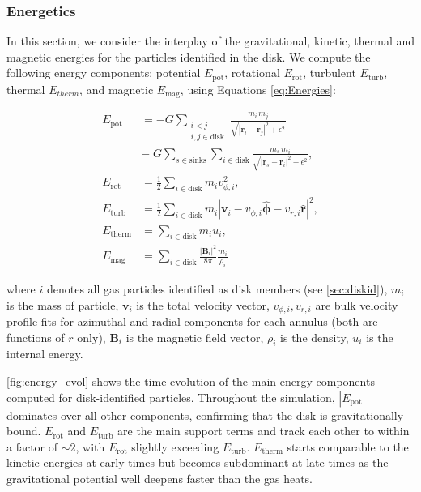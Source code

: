 \documentclass[twocolumn]{openjournal}
\begin{document}
\subsubsection{Energetics}
\label{sec:energyevol}

In this section, we consider the interplay of the gravitational, kinetic,
thermal and magnetic energies for the particles identified in the disk.
We compute the following energy components:
potential $E_{\text{pot}}$,
rotational $E_{\text{rot}}$,
turbulent $E_{\text{turb}}$,
thermal $E_{therm}$,
and magnetic $E_{\text{mag}}$, using Equations \ref{eq:Energies}:

\begin{subequations}
	\label{eq:Energies}
	\begin{align}
		E_\mathrm{pot}   & = -G \sum_{\substack{i < j                                     \\ i,j \in \mathrm{disk}}}
		\frac{m_i \, m_j}{\sqrt{|\mathbf{r}_i - \mathbf{r}_j|^2 + \epsilon^2}}            \\
		                 & -\; G \sum_{s \in \mathrm{sinks}} \sum_{i \in \mathrm{disk}}
		\frac{m_s \, m_i}{\sqrt{|\mathbf{r}_s - \mathbf{r}_i|^2 + \epsilon^2}}, \nonumber \\
		E_\mathrm{rot}   & = \tfrac{1}{2}\sum_{i \in \mathrm{disk}} m_i v_{\phi,i}^2,     \\
		E_\mathrm{turb}  & = \tfrac{1}{2}\sum_{i \in \mathrm{disk}} m_i |\mathbf{v}_i
		- v_{\phi,i}\hat{\boldsymbol{\phi}} - v_{r,i}\hat{\boldsymbol{r}}|^2,             \\
		E_\mathrm{therm} & = \sum_{i \in \mathrm{disk}} m_i u_i,                          \\
		E_\mathrm{mag}   & = \sum_{i \in \mathrm{disk}} \frac{|\mathbf{B}_i|^2}{8\pi}
		\frac{m_i}{\rho_i}
	\end{align}
\end{subequations}

where $i$ denotes all gas particles identified as disk members
(see \autoref{sec:diskid}),
$m_i$ is the mass of particle, $\textbf{v}_i$ is the total velocity vector,
$v_{\phi, i}, v_{r, i}$ are bulk velocity profile fits for azimuthal and radial
components for each annulus (both are functions of $r$ only),
$\textbf{B}_i$ is the magnetic field vector,
$\rho_i$ is the density, $u_i$ is the internal energy.

\autoref{fig:energy_evol} shows the time evolution of the main energy
components computed for disk-identified particles. Throughout the simulation,
$|E_\mathrm{pot}|$ dominates over all other components, confirming that the
disk is gravitationally bound. $E_\mathrm{rot}$ and $E_\mathrm{turb}$
are the main support terms and track each other to within a factor of $\sim 2$,
with $E_\mathrm{rot}$ slightly exceeding $E_\mathrm{turb}$. $E_\mathrm{therm}$
starts comparable to the kinetic energies at early times but becomes
subdominant at late times as the gravitational potential well deepens faster than the gas heats.
\end{document}
